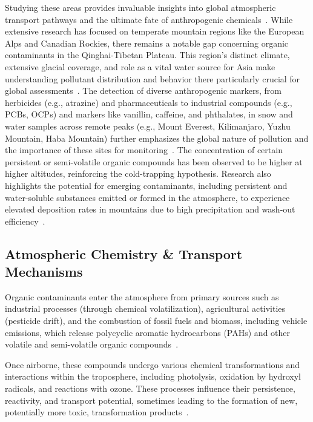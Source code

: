 \documentclass[11pt]{article}
\begin{document}
\begin{doublespace}
        Studying these areas provides invaluable insights into global atmospheric transport pathways and the ultimate fate of anthropogenic chemicals~\cite{Daly2005}.
        While extensive research has focused on temperate mountain regions like the European Alps and Canadian Rockies, there remains a notable gap concerning organic contaminants in the Qinghai-Tibetan Plateau.
        This region's distinct climate, extensive glacial coverage, and role as a vital water source for Asia make understanding pollutant distribution and behavior there particularly crucial for global assessments~\cite{Wenkai}.
        The detection of diverse anthropogenic markers, from herbicides (e.g., atrazine) and pharmaceuticals to industrial compounds (e.g., PCBs, OCPs) and markers like vanillin, caffeine, and phthalates, in snow and water samples across remote peaks (e.g., Mount Everest, Kilimanjaro, Yuzhu Mountain, Haba Mountain) further emphasizes the global nature of pollution and the importance of these sites for monitoring~\cite{Wenkai}.
        The concentration of certain persistent or semi-volatile organic compounds has been observed to be higher at higher altitudes, reinforcing the cold-trapping hypothesis.
        Research also highlights the potential for emerging contaminants, including persistent and water-soluble substances emitted or formed in the atmosphere, to experience elevated deposition rates in mountains due to high precipitation and wash-out efficiency~\cite{Daly2005}.

    \subsection{Atmospheric Chemistry \& Transport Mechanisms}
    Organic contaminants enter the atmosphere from primary sources such as industrial processes (through chemical volatilization), agricultural activities (pesticide drift), and the combustion of fossil fuels and biomass, including vehicle emissions, which release polycyclic aromatic hydrocarbons (PAHs) and other volatile and semi-volatile organic compounds~\cite{Wenkai}.

    Once airborne, these compounds undergo various chemical transformations and interactions within the troposphere, including photolysis, oxidation by hydroxyl radicals, and reactions with ozone. 
    These processes influence their persistence, reactivity, and transport potential, sometimes leading to the formation of new, potentially more toxic, transformation products~\cite{Wenkai}.


\end{doublespace}
\end{document}
